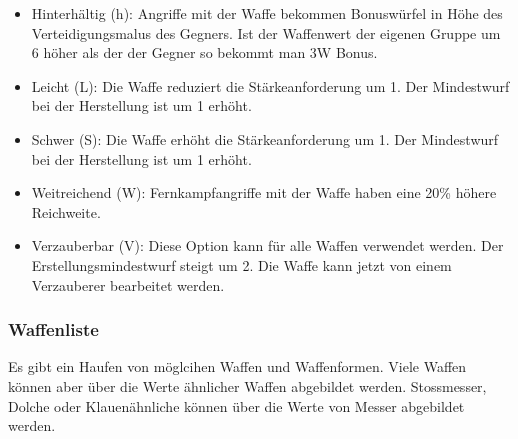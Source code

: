 \documentclass{article}
\begin{document}
\begin{itemize}
\item Hinterhältig (h): Angriffe mit der Waffe bekommen Bonuswürfel in Höhe des Verteidigungsmalus des Gegners. Ist der Waffenwert der eigenen Gruppe um 6 höher als der der Gegner so bekommt man 3W Bonus.
\item Leicht (L): Die Waffe reduziert die Stärkeanforderung um 1. Der Mindestwurf bei der Herstellung ist um 1 erhöht.
\item Schwer (S): Die Waffe erhöht die Stärkeanforderung um 1. Der Mindestwurf bei der Herstellung ist um 1 erhöht.
\item Weitreichend (W): Fernkampfangriffe mit der Waffe haben eine 20\% höhere Reichweite.
\item Verzauberbar (V): Diese Option kann für alle Waffen verwendet werden. Der Erstellungsmindestwurf steigt um 2. Die Waffe kann jetzt von einem Verzauberer bearbeitet werden.
\end{itemize}

\subsubsection{Waffenliste}

Es gibt ein Haufen von möglcihen Waffen und Waffenformen. Viele Waffen können aber über die Werte ähnlicher Waffen
abgebildet werden. Stossmesser, Dolche oder Klauenähnliche können über die Werte von Messer abgebildet werden.
\end{document}
